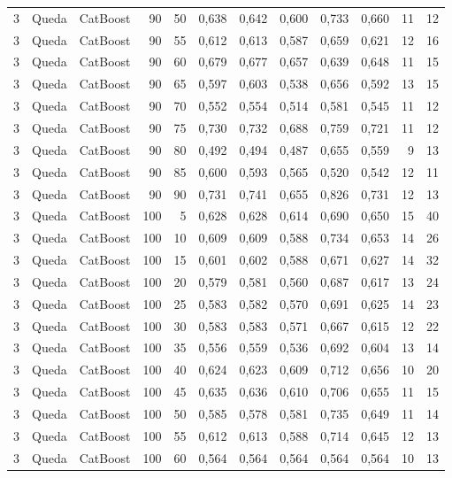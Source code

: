 \begin{longtable}{@{}rllrrrrrrrrr@{}}
3 & Queda & CatBoost & 90 & 50 & 0,638 & 0,642 & 0,600 & 0,733 & 0,660 & 11 & 12 \\
3 & Queda & CatBoost & 90 & 55 & 0,612 & 0,613 & 0,587 & 0,659 & 0,621 & 12 & 16 \\
3 & Queda & CatBoost & 90 & 60 & 0,679 & 0,677 & 0,657 & 0,639 & 0,648 & 11 & 15 \\
3 & Queda & CatBoost & 90 & 65 & 0,597 & 0,603 & 0,538 & 0,656 & 0,592 & 13 & 15 \\
3 & Queda & CatBoost & 90 & 70 & 0,552 & 0,554 & 0,514 & 0,581 & 0,545 & 11 & 12 \\
3 & Queda & CatBoost & 90 & 75 & 0,730 & 0,732 & 0,688 & 0,759 & 0,721 & 11 & 12 \\
3 & Queda & CatBoost & 90 & 80 & 0,492 & 0,494 & 0,487 & 0,655 & 0,559 & 9 & 13 \\
3 & Queda & CatBoost & 90 & 85 & 0,600 & 0,593 & 0,565 & 0,520 & 0,542 & 12 & 11 \\
3 & Queda & CatBoost & 90 & 90 & 0,731 & 0,741 & 0,655 & 0,826 & 0,731 & 12 & 13 \\
3 & Queda & CatBoost & 100 & 5 & 0,628 & 0,628 & 0,614 & 0,690 & 0,650 & 15 & 40 \\
3 & Queda & CatBoost & 100 & 10 & 0,609 & 0,609 & 0,588 & 0,734 & 0,653 & 14 & 26 \\
3 & Queda & CatBoost & 100 & 15 & 0,601 & 0,602 & 0,588 & 0,671 & 0,627 & 14 & 32 \\
3 & Queda & CatBoost & 100 & 20 & 0,579 & 0,581 & 0,560 & 0,687 & 0,617 & 13 & 24 \\
3 & Queda & CatBoost & 100 & 25 & 0,583 & 0,582 & 0,570 & 0,691 & 0,625 & 14 & 23 \\
3 & Queda & CatBoost & 100 & 30 & 0,583 & 0,583 & 0,571 & 0,667 & 0,615 & 12 & 22 \\
3 & Queda & CatBoost & 100 & 35 & 0,556 & 0,559 & 0,536 & 0,692 & 0,604 & 13 & 14 \\
3 & Queda & CatBoost & 100 & 40 & 0,624 & 0,623 & 0,609 & 0,712 & 0,656 & 10 & 20 \\
3 & Queda & CatBoost & 100 & 45 & 0,635 & 0,636 & 0,610 & 0,706 & 0,655 & 11 & 15 \\
3 & Queda & CatBoost & 100 & 50 & 0,585 & 0,578 & 0,581 & 0,735 & 0,649 & 11 & 14 \\
3 & Queda & CatBoost & 100 & 55 & 0,612 & 0,613 & 0,588 & 0,714 & 0,645 & 12 & 13 \\
3 & Queda & CatBoost & 100 & 60 & 0,564 & 0,564 & 0,564 & 0,564 & 0,564 & 10 & 13 \\

\end{longtable}
